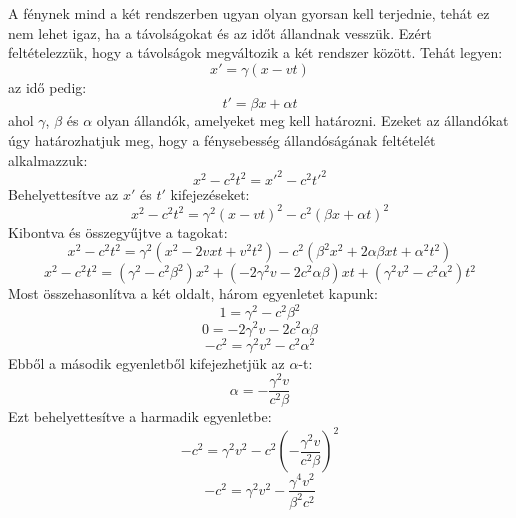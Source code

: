 \documentclass[a4paper,12pt]{article}
\begin{document}
A fénynek mind a két rendszerben ugyan olyan gyorsan kell terjednie, tehát ez nem lehet igaz, ha a távolságokat és az időt állandnak vesszük. Ezért feltételezzük, hogy a távolságok megváltozik a két rendszer között.
Tehát legyen:
\begin{equation}
    x' = \gamma (x - vt)
\end{equation}
az idő pedig:
\begin{equation}
    t' = \beta x + \alpha t
\end{equation}
ahol $\gamma$, $\beta$ és $\alpha$ olyan állandók, amelyeket meg kell határozni. Ezeket az állandókat úgy határozhatjuk meg, hogy a fénysebesség állandóságának feltételét alkalmazzuk:
\begin{equation}
    x^2 - c^2 t^2 = x'^2 - c^2 t'^2
\end{equation}
Behelyettesítve az $x'$ és $t'$ kifejezéseket:
\begin{equation}
    x^2 - c^2 t^2 = \gamma^2 (x - vt)^2 - c^2 (\beta x + \alpha t)^2
\end{equation}
Kibontva és összegyűjtve a tagokat:
\begin{equation}
    x^2 - c^2 t^2 = \gamma^2 (x^2 - 2vxt + v^2 t^2) - c^2 (\beta^2 x^2 + 2 \alpha \beta xt + \alpha^2 t^2)
\end{equation}
\begin{equation}
    x^2 - c^2 t^2 = (\gamma^2 - c^2 \beta^2) x^2 + (-2 \gamma^2 v - 2 c^2 \alpha \beta) xt + (\gamma^2 v^2 - c^2 \alpha^2) t^2
\end{equation}
Most összehasonlítva a két oldalt, három egyenletet kapunk:
\begin{equation}
    1 = \gamma^2 - c^2 \beta^2
\end{equation}
\begin{equation}
    0 = -2 \gamma^2 v - 2 c^2 \alpha \beta
\end{equation}
\begin{equation}
    -c^2 = \gamma^2 v^2 - c^2 \alpha^2
\end{equation}
Ebből a második egyenletből kifejezhetjük az $\alpha$-t:
\begin{equation}
    \alpha = -\frac{\gamma^2 v}{c^2 \beta}
\end{equation}
Ezt behelyettesítve a harmadik egyenletbe:
\begin{equation}
    -c^2 = \gamma^2 v^2 - c^2 \left(-\frac{\gamma^2 v}{c^2 \beta}\right)^2
\end{equation}
\begin{equation}
    -c^2 = \gamma^2 v^2 - \frac{\gamma^4 v^2}{\beta^2 c^2}
\end{equation}
\end{document}
